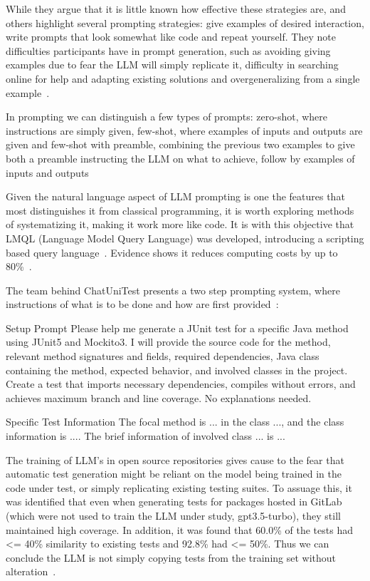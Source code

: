 While they argue that it is little known how effective these strategies are, \citet{kn:johnny} and others highlight several prompting strategies: give examples of desired interaction, write prompts that look somewhat like code and repeat yourself. They note difficulties participants have in prompt generation, such as avoiding giving examples due to fear the LLM will simply replicate it, difficulty in searching online for help and adapting existing solutions and overgeneralizing from a single example~\cite{kn:johnny}.

In prompting we can distinguish a few types of prompts: zero-shot, where instructions are simply given, few-shot, where examples of inputs and outputs are given and few-shot with preamble, combining the previous two examples to give both a preamble instructing the LLM on what to achieve, follow by examples of inputs and outputs~\cite{kn:promptprofiannaca}

Given the natural language aspect of LLM prompting is one the features that most distinguishes it from classical programming, it is worth exploring methods of systematizing it, making it work more like code. It is with this objective that LMQL (Language Model Query Language) was developed, introducing a scripting based query language~\cite{kn:lmql}. Evidence shows it reduces computing costs by up to 80\%~\cite{kn:lmql}.

The team behind ChatUniTest presents a two step prompting system, where instructions of what is to be done and how are first provided~\cite{kn:chatunitest}:

\begin{prompt}
Setup Prompt
Please help me generate a JUnit test for a specific Java method using JUnit5 and Mockito3.
I will provide the source code for the method, relevant method signatures and fields, required dependencies, Java class containing the method, expected behavior, and involved classes in the project.
Create a test that imports necessary dependencies, compiles without errors, and achieves maximum branch and line coverage. 
No explanations needed. 

Specific Test Information
The focal method is ... in the class ..., and the class information is .... The brief information of involved class ... is ...   
\end{prompt}


The training of LLM's in open source repositories gives cause to the fear that automatic test generation might be reliant on the model being trained in the code under test, or simply replicating existing testing suites. To assuage this, it was identified that even when generating tests for packages hosted in GitLab (which were not used to train the LLM under study, gpt3.5-turbo), they still maintained high coverage. In addition, it was found that 60.0\% of the tests had <= 40\% similarity to existing tests and 92.8\% had <= 50\%. Thus we can conclude the LLM is not simply copying tests from the training set without alteration~\cite{kn:max}.


